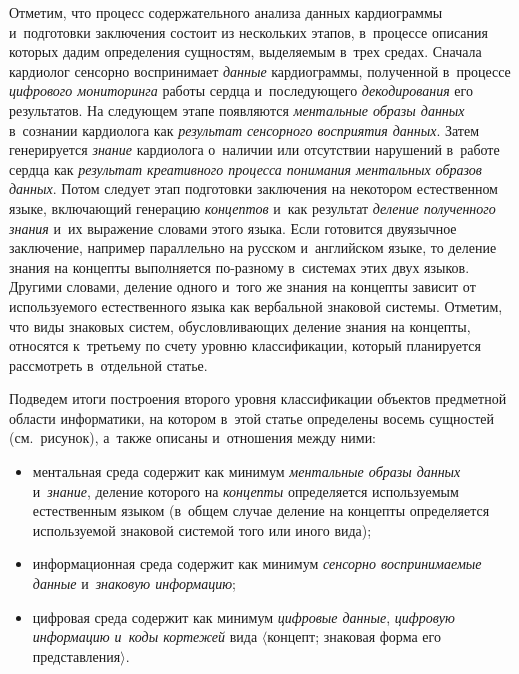 \begin{multicols}{2}
  Отметим, что процесс содержательного анализа данных кардиограммы 
и~подготовки заключения состоит из нескольких этапов, в~процессе описания 
которых дадим определения сущностям, вы\-де\-ля\-емым в~трех средах. Сначала 
кардиолог сенсорно воспринимает \textit{данные} кардиограммы, полученной 
в~процессе \textit{цифрового мониторинга} работы сердца и~последующего 
\textit{декодирования} его результатов. На следующем этапе появляются 
\textit{ментальные образы данных} в~сознании кардиолога как 
\textit{результат сенсорного восприятия данных}. Затем генерируется 
\textit{знание} кардиолога о~наличии или отсутствии нарушений в~работе 
сердца как \textit{результат креативного процесса понимания ментальных 
образов данных}. Потом следует этап подготовки заключения на некотором 
естественном языке, включающий генерацию \textit{концептов} и~как результат 
\textit{деление полученного знания} и~их выражение словами этого языка. Если 
готовится двуязычное заключение, например параллельно на русском 
и~английском языке, то деление знания на концепты выполняется 
 по-раз\-но\-му в~сис\-те\-мах этих двух языков. Другими словами, деление одного и~того же знания на концепты зависит от используемого естественного языка 
как вербальной знаковой сис\-те\-мы. Отметим, что виды знаковых сис\-тем, 
обусловливающих деление знания на концепты, относятся к~третьему по сче\-ту 
уровню классификации, который планируется рас\-смот\-реть в~отдельной статье.
  

  
  Подведем итоги построения второго уровня классификации объектов 
предметной об\-ласти информатики, на котором в~этой \mbox{статье} определены восемь 
сущностей (см.\ рисунок), а~так\-же описаны и~отношения между ними:
\begin{itemize}
  \item  ментальная среда содержит как минимум \textit{ментальные образы 
данных} и~\textit{знание}, деление которого на \textit{концепты} определяется 
используемым естественным языком (в~общем случае деление на концепты 
определяется используемой знаковой сис\-те\-мой того или иного вида);
  \item информационная среда содержит как минимум \textit{сенсорно 
воспринимаемые данные} и~\textit{знаковую информацию};
  \item цифровая среда содержит как минимум \textit{цифровые данные}, 
\textit{цифровую информацию и~коды кортежей} вида $\langle$концепт; 
знаковая форма его пред\-став\-ле\-ния$\rangle$.
  \end{itemize}
  

\end{multicols}
